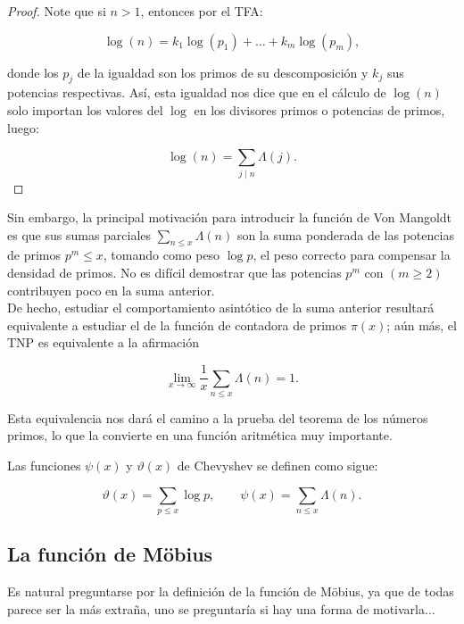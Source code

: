 \begin{proof}

Note que si $n>1$, entonces por el TFA:

$$\log(n)=k_1\log(p_1)+\ldots+k_m\log(p_m),$$

 donde los $p_j$ de la igualdad son los primos de su descomposición y $k_j$ sus potencias respectivas. Así, esta igualdad nos dice que en el cálculo de $\log(n)$ solo importan los valores del $\log$ en los divisores primos o potencias de primos, luego:

 $$\log(n)=\sum_{j\mid n}\Lambda(j).$$
\end{proof}

Sin embargo, la principal motivación para introducir la función de Von Mangoldt es que sus sumas parciales $\displaystyle\sum_{n \leq x} \Lambda(n)$ son la suma ponderada de las potencias de primos $p^m \leq x$, tomando como peso $\log p$, el peso correcto para compensar la densidad de primos. No es difícil demostrar que las potencias $p^m$ con $(m \geq 2)$ contribuyen poco en la suma anterior.\\

De hecho, estudiar el comportamiento asintótico de la suma anterior resultará equivalente a estudiar el de la función de contadora de primos $\pi(x)$; aún más, el TNP es equivalente a la afirmación

$$
\lim _{x \rightarrow \infty} \frac{1}{x} \sum_{n \leq x} \Lambda(n)=1 .
$$

Esta equivalencia nos dará el camino a la prueba del teorema de los números primos, lo que la convierte en una función aritmética muy importante.\cite{hildebrand2006introduction}

\begin{definition}

Las funciones $\psi(x)$ y $\vartheta(x)$ de Chevyshev se definen como sigue:

$$\vartheta(x)=\sum_{p\leq x}\log p, \quad \quad \psi(x)=\sum_{n \leq x} \Lambda(n).$$

\end{definition}

\subsection{La función de Möbius}

Es natural preguntarse por la definición de la función de Möbius, ya que de todas parece ser la más extraña, uno se preguntaría si hay una forma de motivarla... \\

